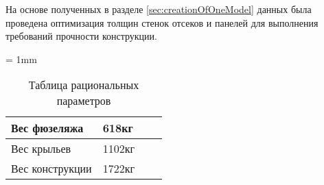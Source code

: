 На основе полученных в разделе \ref{sec:creationOfOneModel} данных была проведена оптимизация толщин стенок отсеков и панелей для выполнения требований прочности конструкции. 




\tabulinesep = 1mm
\begin{table}[H]
\captionsetup{justification=centering}
\caption{Таблица рациональных параметров}
\begin{tabu}to 
\hline
Вес фюзеляжа & 618кг & & \\ \hline
Вес крыльев & 1102кг & & \\ \hline
Вес конструкции & 1722кг & & \\ \hline
\end{tabu}
\end{table}

